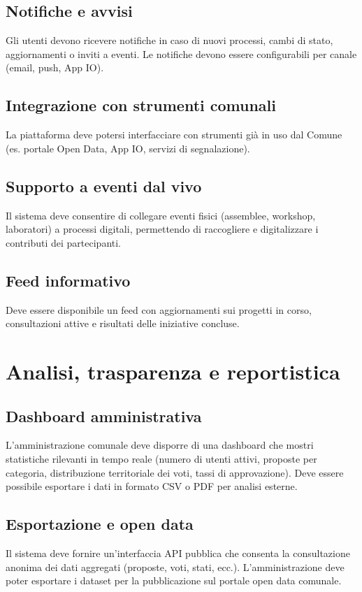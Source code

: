 \subsection{Notifiche e avvisi}
Gli utenti devono ricevere notifiche in caso di nuovi processi, cambi di stato, aggiornamenti o inviti a eventi.  
Le notifiche devono essere configurabili per canale (email, push, App IO).

\subsection{Integrazione con strumenti comunali}
La piattaforma deve potersi interfacciare con strumenti già in uso dal Comune (es. portale Open Data, App IO, servizi di segnalazione).

\subsection{Supporto a eventi dal vivo}
Il sistema deve consentire di collegare eventi fisici (assemblee, workshop, laboratori) a processi digitali, permettendo di raccogliere e digitalizzare i contributi dei partecipanti.

\subsection{Feed informativo}
Deve essere disponibile un feed con aggiornamenti sui progetti in corso, consultazioni attive e risultati delle iniziative concluse.

\section{Analisi, trasparenza e reportistica}

\subsection{Dashboard amministrativa}
L’amministrazione comunale deve disporre di una dashboard che mostri statistiche rilevanti in tempo reale (numero di utenti attivi, proposte per categoria, distribuzione territoriale dei voti, tassi di approvazione).  
Deve essere possibile esportare i dati in formato CSV o PDF per analisi esterne.

\subsection{Esportazione e open data}
Il sistema deve fornire un’interfaccia API pubblica che consenta la consultazione anonima dei dati aggregati (proposte, voti, stati, ecc.).  
L’amministrazione deve poter esportare i dataset per la pubblicazione sul portale open data comunale.

